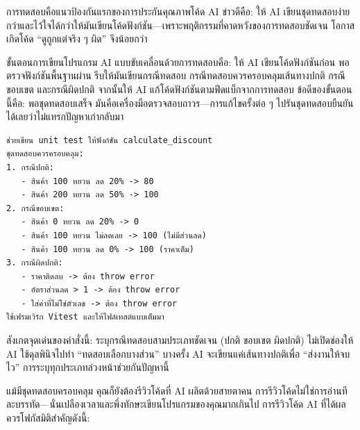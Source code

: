 


การทดสอบคือแนวป้องกันแรกของการประกันคุณภาพโค้ด AI ข่าวดีคือ: ให้ AI เขียนชุดทดสอบง่ายกว่าและไว้ใจได้กว่าให้มันเขียนโค้ดฟังก์ชัน—เพราะพฤติกรรมที่คาดหวังของการทดสอบชัดเจน โอกาสเกิดโค้ด “ดูถูกแต่จริง ๆ ผิด” จึงน้อยกว่า

ขั้นตอนการเขียนโปรแกรม AI แบบขับเคลื่อนด้วยการทดสอบคือ: ให้ AI เขียนโค้ดฟังก์ชันก่อน พอตรวจฟังก์ชันพื้นฐานผ่าน รีบให้มันเขียนกรณีทดสอบ กรณีทดสอบควรครอบคลุมเส้นทางปกติ กรณีขอบเขต และกรณีผิดปกติ จากนั้นให้ AI แก้โค้ดฟังก์ชันตามฟีดแบ็กจากการทดสอบ ข้อดีของขั้นตอนนี้คือ: พอชุดทดสอบเสร็จ มันคือเครื่องมือตรวจสอบถาวร—การแก้ไขครั้งต่อ ๆ ไปรันชุดทดสอบยืนยันได้เลยว่าไม่แทรกปัญหาเก่ากลับมา

\begin{lstlisting}
ช่วยเขียน unit test ให้ฟังก์ชัน calculate_discount
ชุดทดสอบควรครอบคลุม:
1. กรณีปกติ:
   - สินค้า 100 หยวน ลด 20% -> 80
   - สินค้า 200 หยวน ลด 50% -> 100
2. กรณีขอบเขต:
   - สินค้า 0 หยวน ลด 20% -> 0
   - สินค้า 100 หยวน ไม่ลดเลย -> 100 (ไม่มีส่วนลด)
   - สินค้า 100 หยวน ลด 0% -> 100 (ราคาเต็ม)
3. กรณีผิดปกติ:
   - ราคาติดลบ -> ต้อง throw error
   - อัตราส่วนลด > 1 -> ต้อง throw error
   - ใส่ค่าที่ไม่ใช่ตัวเลข -> ต้อง throw error
ใช้เฟรมเวิร์ก Vitest และให้ไฟล์เทสต์แบบเต็มมา
\end{lstlisting}

สังเกตจุดเด่นของคำสั่งนี้: ระบุกรณีทดสอบสามประเภทชัดเจน (ปกติ ขอบเขต ผิดปกติ) ไม่เปิดช่องให้ AI ใช้ดุลพินิจไปทำ “ทดสอบเลือกบางส่วน” บางครั้ง AI จะเขียนแค่เส้นทางปกติเพื่อ “ส่งงานให้จบไว” การระบุทุกประเภทล่วงหน้าช่วยกันปัญหานี้


แม้มีชุดทดสอบครอบคลุม คุณก็ยังต้องรีวิวโค้ดที่ AI ผลิตด้วยสายตาคน การรีวิวโค้ดไม่ใช่การอ่านทีละบรรทัด—นั่นเปลืองเวลาและพึ่งทักษะเขียนโปรแกรมของคุณมากเกินไป การรีวิวโค้ด AI ที่ได้ผลควรโฟกัสมิติสำคัญดังนี้:


